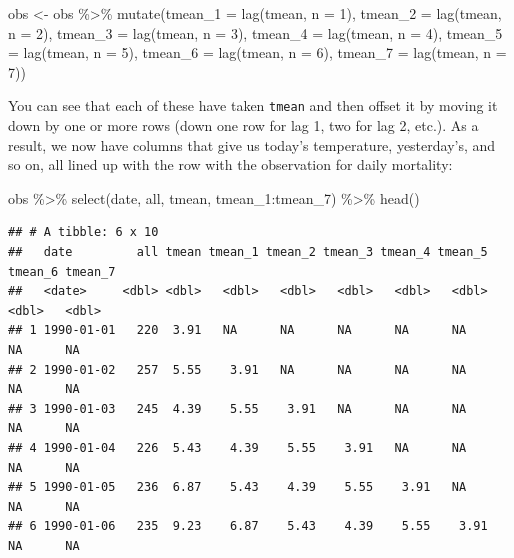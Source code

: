 \documentclass[
]{book}
\newenvironment{Shaded}{\begin{snugshade}}{\end{snugshade}}
\newcommand{\AttributeTok}[1]{\textcolor[rgb]{0.77,0.63,0.00}{#1}}
\newcommand{\DecValTok}[1]{\textcolor[rgb]{0.00,0.00,0.81}{#1}}
\newcommand{\FunctionTok}[1]{\textcolor[rgb]{0.00,0.00,0.00}{#1}}
\newcommand{\NormalTok}[1]{#1}
\newcommand{\OtherTok}[1]{\textcolor[rgb]{0.56,0.35,0.01}{#1}}
\newcommand{\SpecialCharTok}[1]{\textcolor[rgb]{0.00,0.00,0.00}{#1}}
\begin{document}
\begin{Shaded}
\begin{Highlighting}[]
\NormalTok{obs }\OtherTok{\textless{}{-}}\NormalTok{ obs }\SpecialCharTok{\%\textgreater{}\%} 
  \FunctionTok{mutate}\NormalTok{(}\AttributeTok{tmean\_1 =} \FunctionTok{lag}\NormalTok{(tmean, }\AttributeTok{n =} \DecValTok{1}\NormalTok{), }
         \AttributeTok{tmean\_2 =} \FunctionTok{lag}\NormalTok{(tmean, }\AttributeTok{n =} \DecValTok{2}\NormalTok{), }
         \AttributeTok{tmean\_3 =} \FunctionTok{lag}\NormalTok{(tmean, }\AttributeTok{n =} \DecValTok{3}\NormalTok{), }
         \AttributeTok{tmean\_4 =} \FunctionTok{lag}\NormalTok{(tmean, }\AttributeTok{n =} \DecValTok{4}\NormalTok{), }
         \AttributeTok{tmean\_5 =} \FunctionTok{lag}\NormalTok{(tmean, }\AttributeTok{n =} \DecValTok{5}\NormalTok{), }
         \AttributeTok{tmean\_6 =} \FunctionTok{lag}\NormalTok{(tmean, }\AttributeTok{n =} \DecValTok{6}\NormalTok{), }
         \AttributeTok{tmean\_7 =} \FunctionTok{lag}\NormalTok{(tmean, }\AttributeTok{n =} \DecValTok{7}\NormalTok{))}
\end{Highlighting}
\end{Shaded}

You can see that each of these have taken \texttt{tmean} and then offset it by moving it down
by one or more rows (down one row for lag 1, two for lag 2, etc.). As a result, we now have
columns that give us today's temperature, yesterday's, and so on, all lined up with the
row with the observation for daily mortality:

\begin{Shaded}
\begin{Highlighting}[]
\NormalTok{obs }\SpecialCharTok{\%\textgreater{}\%} 
  \FunctionTok{select}\NormalTok{(date, all, tmean, tmean\_1}\SpecialCharTok{:}\NormalTok{tmean\_7) }\SpecialCharTok{\%\textgreater{}\%} 
  \FunctionTok{head}\NormalTok{()}
\end{Highlighting}
\end{Shaded}

\begin{verbatim}
## # A tibble: 6 x 10
##   date         all tmean tmean_1 tmean_2 tmean_3 tmean_4 tmean_5 tmean_6 tmean_7
##   <date>     <dbl> <dbl>   <dbl>   <dbl>   <dbl>   <dbl>   <dbl>   <dbl>   <dbl>
## 1 1990-01-01   220  3.91   NA      NA      NA      NA      NA         NA      NA
## 2 1990-01-02   257  5.55    3.91   NA      NA      NA      NA         NA      NA
## 3 1990-01-03   245  4.39    5.55    3.91   NA      NA      NA         NA      NA
## 4 1990-01-04   226  5.43    4.39    5.55    3.91   NA      NA         NA      NA
## 5 1990-01-05   236  6.87    5.43    4.39    5.55    3.91   NA         NA      NA
## 6 1990-01-06   235  9.23    6.87    5.43    4.39    5.55    3.91      NA      NA
\end{verbatim}
\end{document}
